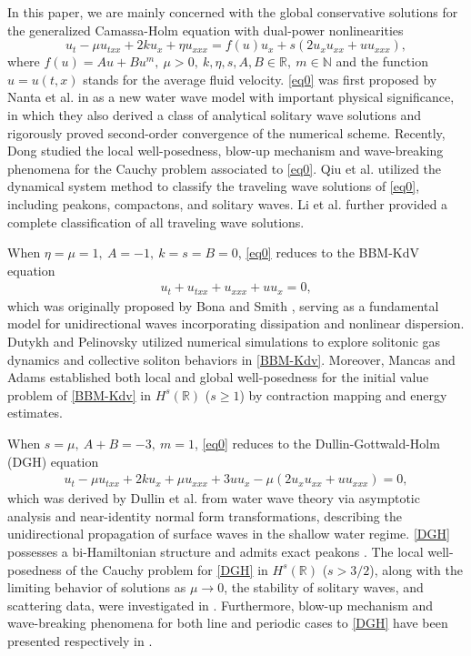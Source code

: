 \documentclass[10pt]{article}
\numberwithin{equation}{section}
\begin{document}
	In this paper, we are mainly concerned with the global conservative solutions for the generalized Camassa-Holm equation with dual-power nonlinearities
	\begin{equation}\label{eq0}
		u_t-\mu u_{txx}+2ku_x+\eta u_{xxx}=f(u)u_x+s(2u_xu_{xx}+uu_{xxx}),
	\end{equation}
	where $f(u)=Au+Bu^m,\ \mu>0,\ k,\eta,s,A,B\in\mathbb{R},\ m\in\mathbb{N}$ and the function $u=u(t,x)$ stands for the average fluid velocity. \eqref{eq0} was first proposed by Nanta et al. in \cite{nanta2021identification} as a new water wave model with important physical significance, in which they also derived a class of analytical solitary wave solutions and rigorously proved second-order convergence of the numerical scheme. Recently, Dong \cite{dong2024wave} studied the local well-posedness, blow-up mechanism and wave-breaking phenomena for the Cauchy problem associated to \eqref{eq0}. Qiu et al. \cite{qiu2022traveling}  utilized the dynamical system method to classify the traveling wave solutions of \eqref{eq0}, including peakons, compactons, and solitary waves. Li et al. \cite{li2024classification} further provided a complete classification of all traveling wave solutions.
	
	When $\eta=\mu=1,\ A=-1,\ k=s=B=0$, \eqref{eq0} reduces to the BBM-KdV equation
	\begin{align}\label{BBM-Kdv}
		u_t+u_{txx}+u_{xxx}+uu_x=0,
	\end{align}
	which was originally proposed by Bona and Smith \cite{bona1975initial}, serving as a fundamental model for unidirectional waves incorporating dissipation and nonlinear dispersion. Dutykh and Pelinovsky \cite{dutykh2014numerical} utilized numerical simulations to explore solitonic gas dynamics and collective soliton behaviors in \eqref{BBM-Kdv}. Moreover, Mancas and Adams \cite{mancas2017elliptic} established both local and global well-posedness for the initial value problem of \eqref{BBM-Kdv} in $H^s(\mathbb{R})$ ($s \ge 1$) by contraction mapping and energy estimates.
	
	When $s=\mu,\ A+B=-3,\ m=1$, \eqref{eq0} reduces to the Dullin-Gottwald-Holm (DGH) equation
	\begin{align}\label{DGH}
		u_t-\mu u_{txx}+2ku_x+\mu u_{xxx}+3uu_x-\mu (2u_xu_{xx}+uu_{xxx})=0,
	\end{align}
	which was derived by Dullin et al.\cite{dullin2001integrable} from water wave theory via asymptotic analysis and near-identity normal form transformations, describing the unidirectional propagation of surface waves in the shallow water regime. \eqref{DGH} possesses a bi-Hamiltonian structure and admits exact peakons \cite{dullin2001integrable}. The local well-posedness of the Cauchy problem for \eqref{DGH} in $H^s(\mathbb{R})$ ($s > 3/2$), along with the limiting behavior of solutions as $\mu \to 0$, the stability of solitary waves, and scattering data, were investigated in \cite{tian2005well}. Furthermore, blow-up mechanism and wave-breaking phenomena for both line and periodic cases to \eqref{DGH} have been presented respectively in \cite{liu2006global,zhang2008blow}.
	
\end{document}
